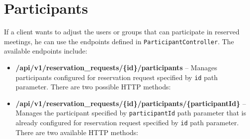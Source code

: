 \section{Participants}
If a client wants to adjust the users or groups that can participate in reserved meetings, he can use the endpoints defined in  \texttt{Participant\-Controller}.
The available endpoints include:
\begin{itemize}
    \item \textbf{/api/v1/reservation\_requests/\{id\}/participants} -- Manages participants configured for reservation request specified by \texttt{id} path parameter. There are two possible HTTP methods:
    \item \textbf{/api/v1/reservation\_requests/\{id\}/participants/\{participantId\}} -- Manages the participant specified by \texttt{participantId} path parameter that is already configured for reservation request specified by \texttt{id} path parameter. There are two available HTTP methods:
\end{itemize}
